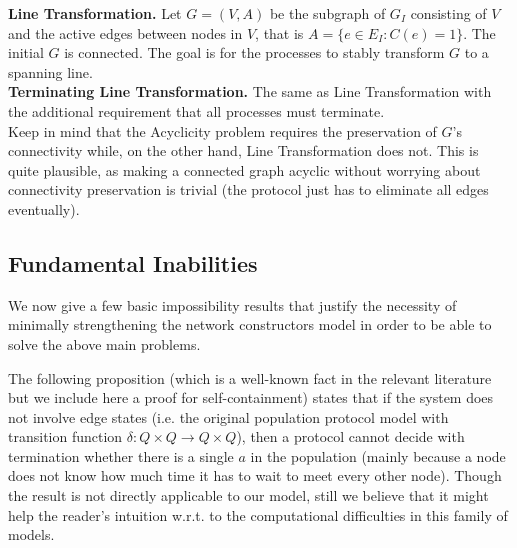 \documentclass[preprint]{elsarticle}
\newcommand{\ra}{\rightarrow}
\begin{document}
\noindent\textbf{Line Transformation.} Let $G=(V,A)$ be the subgraph of $G_I$ consisting of $V$ and the active edges between nodes in $V$, that is $A=\{e\in E_I: C(e)=1\}$. The initial $G$ is connected. The goal is for the processes to stably transform $G$ to a spanning line.\\

\noindent\textbf{Terminating Line Transformation.} The same as Line Transformation with the additional requirement that all processes must terminate.\\

Keep in mind that the Acyclicity problem requires the preservation of $G$'s connectivity while, on the other hand, Line Transformation does not. This is quite plausible, as making a connected graph acyclic without worrying about connectivity preservation is trivial (the protocol just has to eliminate all edges eventually).

\subsection{Fundamental Inabilities}
\label{subsec:fi}

We now give a few basic impossibility results that justify the necessity of minimally strengthening the network constructors model in order to be able to solve the above main problems.  

The following proposition (which is a well-known fact in the relevant literature but we include here a proof for self-containment) states that if the system does not involve edge states (i.e. the original population protocol model with transition function $\delta:Q\times Q\ra Q\times Q$), then a protocol cannot decide with termination whether there is a single $a$ in the population (mainly because a node does not know how much time it has to wait to meet every other node). Though the result is not directly applicable to our model, still we believe that it might help the reader's intuition w.r.t. to the computational difficulties in this family of models.
\end{document}
